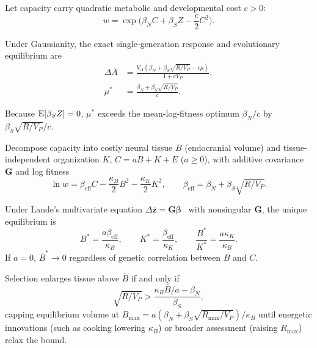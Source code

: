 Let capacity carry quadratic metabolic and developmental cost $c>0$:
\begin{equation}
w=\exp\!\Big(\beta_NC+\beta_SZ-\frac c2C^2\Big).\label{eq:cost}
\end{equation}

\begin{proposition}\label{prop:persist}
Under Gaussianity, the exact single-generation response and evolutionary equilibrium are
\begin{equation}
\begin{aligned}
\Delta\bar A &= \frac{V_A(\beta_N+\beta_S\sqrt{R/V_P}-c\mu)}{1+cV_P},\\
\mu^* &= \frac{\beta_N+\beta_S\sqrt{R/V_P}}{c}.
\end{aligned}\label{eq:mustar}
\end{equation}
\end{proposition}

\begin{corollary}\label{cor:surplus}
Because $\operatorname{E}[\beta_SZ]=0$, $\mu^*$ exceeds the mean-log-fitness optimum $\beta_N/c$ by $\beta_S\sqrt{R/V_P}/c$.
\end{corollary}

Decompose capacity into costly neural tissue $B$ (endocranial volume) and tissue-independent organization $K$, $C=aB+K+E$ ($a\ge0$), with additive covariance $\mathbf G$ and log fitness
\begin{equation}
\ln w=\beta_{\mathrm{eff}}C-\frac{\kappa_B}2B^2-\frac{\kappa_K}2K^2,\qquad \beta_{\mathrm{eff}}=\beta_N+\beta_S\sqrt{R/V_P}.\label{eq:tissuefit}
\end{equation}

\begin{proposition}\label{prop:tissue}
Under Lande's multivariate equation $\Delta\bar{\mathbf z}=\mathbf G\bm\beta$~\cite{lande1979} with nonsingular $\mathbf G$, the unique equilibrium is
\begin{equation}
B^*=\frac{a\beta_{\mathrm{eff}}}{\kappa_B},\qquad K^*=\frac{\beta_{\mathrm{eff}}}{\kappa_K},\qquad \frac{B^*}{K^*}=\frac{a\kappa_K}{\kappa_B}.\label{eq:tissue}
\end{equation}
If $a=0$, $\bar B^*\to0$ regardless of genetic correlation between $B$ and $C$.
\end{proposition}

\begin{corollary}\label{cor:colimit}
Selection enlarges tissue above $\bar B$ if and only if
\begin{equation}
\sqrt{R/V_P}>\frac{\kappa_B\bar B/a-\beta_N}{\beta_S},\label{eq:threshold}
\end{equation}
capping equilibrium volume at $B_{\max}=a(\beta_N+\beta_S\sqrt{R_{\max}/V_P})/\kappa_B$ until energetic innovations (such as cooking lowering $\kappa_B$) or broader assessment (raising $R_{\max}$) relax the bound.
\end{corollary}

